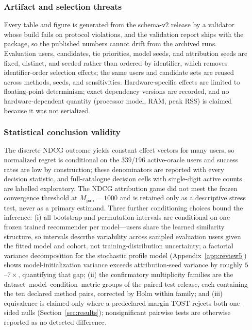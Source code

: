 \documentclass[pdflatex,sn-mathphys-num]{sn-jnl}
\theoremstyle{thmstyleone}
\theoremstyle{thmstyletwo}
\theoremstyle{thmstylethree}
\begin{document}
\subsubsection{Artifact and selection threats}
Every table and figure is generated from the schema-v2 release by a validator whose build fails on protocol violations, and the validation report ships with the package, so the published numbers cannot drift from the archived runs. Evaluation users, candidates, tie priorities, model seeds, and attribution seeds are fixed, distinct, and seeded rather than ordered by identifier, which removes identifier-order selection effects; the same users and candidate sets are reused across methods, seeds, and sensitivities. Hardware-specific effects are limited to floating-point determinism; exact dependency versions are recorded, and no hardware-dependent quantity (processor model, RAM, peak RSS) is claimed because it was not serialized.

\subsubsection{Statistical conclusion validity}
The discrete NDCG outcome yields constant effect vectors for many users, so normalized regret is conditional on the $339$/$196$ active-oracle users and success rates are low by construction; these denominators are reported with every decision statistic, and full-catalogue decision cells with single-digit active counts are labelled exploratory. The NDCG attribution game did not meet the frozen convergence threshold at $M_{\mathrm{pair}}=1000$ and is retained only as a descriptive stress test, never as a primary estimand. Three further conditioning choices bound the inference: (i) all bootstrap and permutation intervals are conditional on one frozen trained recommender per model---users share the learned similarity structure, so intervals describe variability across sampled evaluation users given the fitted model and cohort, not training-distribution uncertainty; a factorial variance decomposition for the stochastic profile model (Appendix~\ref{app:review5}) shows model-initialization variance exceeds attribution-seed variance by roughly $5$--$7\times$, quantifying that gap; (ii) the confirmatory multiplicity families are the dataset--model--condition--metric groups of the paired-test release, each containing the ten declared method pairs, corrected by Holm within family; and (iii) equivalence is claimed only where a predeclared-margin TOST rejects both one-sided nulls (Section~\ref{sec:results}); nonsignificant pairwise tests are otherwise reported as no detected difference.
\end{document}
